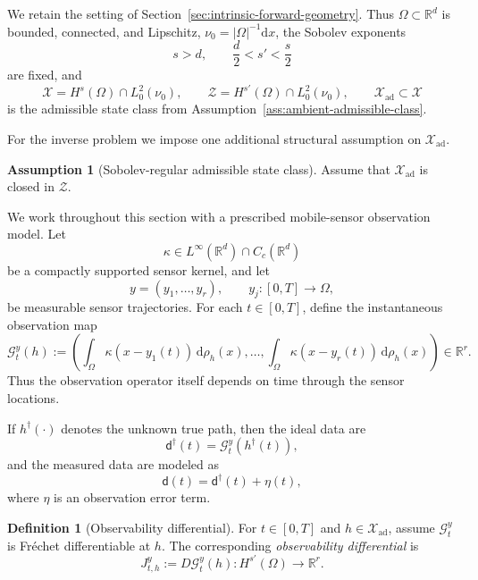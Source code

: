 \documentclass{article}
\theoremstyle{definition}
\newtheorem{definition}[theorem]{Definition}
\newtheorem{assumption}[theorem]{Assumption}
\renewcommand{\d}{\mathrm{d}}
\newcommand{\obsdata}{\mathsf{d}}
\begin{document}
We retain the setting of Section~\ref{sec:intrinsic-forward-geometry}. Thus
\(\Omega\subset\mathbb R^d\) is bounded, connected, and Lipschitz,
\(\nu_0=|\Omega|^{-1}\d x\), the Sobolev exponents
\[
    s>d,
    \qquad
    \frac d2<s'<\frac s2
\]
are fixed, and
\[
    \mathcal X = H^s(\Omega)\cap L^2_0(\nu_0),
    \qquad
    \mathcal Z = H^{s'}(\Omega)\cap L^2_0(\nu_0),
    \qquad
    \mathcal X_{\mathrm{ad}}\subset \mathcal X
\]
is the admissible state class from Assumption~\ref{ass:ambient-admissible-class}.

For the inverse problem we impose one additional structural assumption on
\(\mathcal X_{\mathrm{ad}}\).

\begin{assumption}[Sobolev-regular admissible state class]
    \label{ass:sobolev-admissible-state-class}
    Assume that \(\mathcal X_{\mathrm{ad}}\) is closed in \(\mathcal Z\).
\end{assumption}

We work throughout this section with a prescribed mobile-sensor observation model.
Let
\[
    \kappa\in L^\infty(\mathbb R^d)\cap C_c(\mathbb R^d)
\]
be a compactly supported sensor kernel, and let
\[
    y=(y_1,\dots,y_r),
    \qquad
    y_j:[0,T]\to \Omega,
\]
be measurable sensor trajectories. For each \(t\in[0,T]\), define the instantaneous observation map
\begin{equation}
    \label{eq:mobile-sensor-observation}
    \mathcal G_t^{y}(h)
    :=
    \left(
    \int_\Omega \kappa(x-y_1(t))\,\d\rho_h(x),\dots,
    \int_\Omega \kappa(x-y_r(t))\,\d\rho_h(x)
    \right)\in \mathbb R^r.
\end{equation}
Thus the observation operator itself depends on time through the sensor locations.

If \(h^\dagger(\cdot)\) denotes the unknown true path, then the ideal data are
\[
    \obsdata^\dagger(t)=\mathcal G_t^y(h^\dagger(t)),
\]
and the measured data are modeled as
\[
    \obsdata(t)=\obsdata^\dagger(t)+\eta(t),
\]
where \(\eta\) is an observation error term.

\begin{definition}[Observability differential]
    \label{def:ambient-observability-differential}
    For \(t\in[0,T]\) and \(h\in\mathcal X_{\mathrm{ad}}\), assume \(\mathcal G_t^y\) is
    Fr\'echet differentiable at \(h\). The corresponding \emph{observability differential} is
    \[
        J_{t,h}^{y}:=D\mathcal G_t^y(h):H^{s'}(\Omega)\to\mathbb R^r.
    \]
\end{definition}
\end{document}
